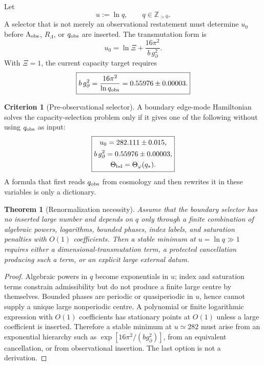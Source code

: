 \documentclass[aps,prd,reprint,nofootinbib,superscriptaddress,floatfix]{revtex4-2}
\numberwithin{equation}{section}
\theoremstyle{definition}
\newtheorem{criterion}{Criterion}[section]
\theoremstyle{plain}
\newtheorem{theorem}{Theorem}[section]
\begin{document}
Let
\begin{equation}
        u:=\ln q,
        \qquad
        q\in\mathbb Z_{>0}.
\end{equation}
A selector that is not merely an observational restatement must determine
\(u_0\) before \(\Lambda_{\rm obs}\), \(R_\Lambda\), or \(q_{\rm obs}\) are
inserted.  The transmutation form is
\begin{equation}
        u_0=\ln\Xi+\frac{16\pi^2}{b\,g_\partial^2}.
\end{equation}
With \(\Xi=1\), the current capacity target requires
\begin{equation}
\boxed{
        b\,g_\partial^2
        =\frac{16\pi^2}{\ln q_{\rm obs}}
        =0.55976\pm0.00003 .
}
\label{eq:preobs-target-coupling}
\end{equation}

\begin{criterion}[Pre-observational selector]
A boundary edge-mode Hamiltonian solves the capacity-selection problem only
if it gives one of the following without using \(q_{\rm obs}\) as input:
\begin{equation}
\boxed{
\begin{gathered}
        u_0=282.111\pm0.015,\\
        b\,g_\partial^2=0.55976\pm0.00003,\\
        \Theta_{\rm bd}=\Theta_\varphi(q_*).
\end{gathered}}
\end{equation}
A formula that first reads \(q_{\rm obs}\) from cosmology and then rewrites
it in these variables is only a dictionary.
\end{criterion}

\begin{theorem}[Renormalization necessity]
Assume that the boundary selector has no inserted large number and depends
on \(q\) only through a finite combination of algebraic powers, logarithms,
bounded phases, index labels, and saturation penalties with \(O(1)\)
coefficients.  Then a stable minimum at \(u=\ln q\gg1\) requires either a
dimensional-transmutation term, a protected cancellation producing such a
term, or an explicit large external datum.
\end{theorem}

\begin{proof}
Algebraic powers in \(q\) become exponentials in \(u\); index and saturation
terms constrain admissibility but do not produce a finite large centre by
themselves.  Bounded phases are periodic or quasiperiodic in \(u\), hence
cannot supply a unique large nonperiodic centre.  A polynomial or finite
logarithmic expression with \(O(1)\) coefficients has stationary points at
\(O(1)\) unless a large coefficient is inserted.  Therefore a stable
minimum at \(u\simeq282\) must arise from an exponential hierarchy such as
\(\exp[16\pi^2/(b g_\partial^2)]\), from an equivalent cancellation, or
from observational insertion.  The last option is not a derivation.
\end{proof}
\end{document}
